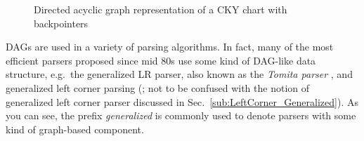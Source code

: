 \begin{figure}
    \centering
\caption{Directed acyclic graph representation of a CKY chart with backpointers}
\label{fig:Chart_DAG}
\end{figure}
%
DAGs are used in a variety of parsing algorithms.
In fact, many of the most efficient parsers proposed since mid 80s use some kind of DAG-like data structure, e.g.\ the generalized LR parser, also known as the \emph{Tomita parser} \citep{Tomita86, Tomita87}, and generalized left corner parsing (\citealp{Nederhof93}; not to be confused with the notion of generalized left corner parser discussed in Sec.~\ref{sub:LeftCorner_Generalized}).
As you can see, the prefix \emph{generalized} is commonly used to denote parsers with some kind of graph-based component.

